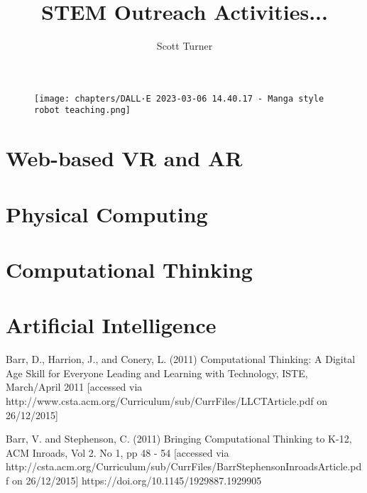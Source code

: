\documentclass[krantz1,ChapterTOCs, book]{krantz}
\begin{document}
\frontmatter

\title{STEM Outreach Activities... 
}
\author{Scott Turner}
\begin{figure}
    \centering
    \texttt{[image: chapters/DALL·E 2023-03-06 14.40.17 - Manga style robot teaching.png]}
\end{figure}
\maketitle

%
\setcounter{page}{7} %
\tableofcontents
%
%
\listoffigures
%
%

\mainmatter
\part{Web-based VR and AR}



\part{Physical Computing}

\part{Computational Thinking}




\part{Artificial Intelligence}







Barr, D., Harrion, J., and Conery, L. (2011) Computational Thinking: A Digital Age Skill for Everyone Leading and Learning with Technology, ISTE, March/April 2011 [accessed via http://www.csta.acm.org/Curriculum/sub/CurrFiles/LLCTArticle.pdf on 26/12/2015]
 
Barr, V. and Stephenson, C. (2011) Bringing Computational Thinking to K-12, ACM Inroads, Vol 2. No 1, pp 48 - 54 [accessed via http://csta.acm.org/Curriculum/sub/CurrFiles/BarrStephensonInroadsArticle.pdf on 26/12/2015]
https://doi.org/10.1145/1929887.1929905
 
\end{document}
